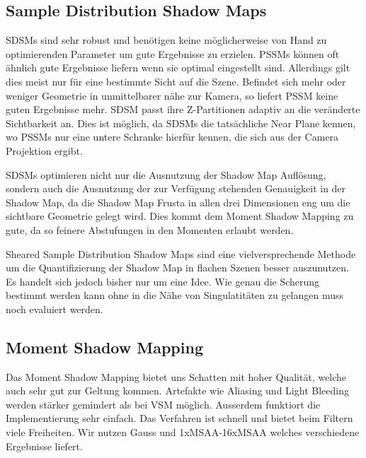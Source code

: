 \documentclass[runningheaders,a4paper]{llncs}
\begin{document}
\subsection{Sample Distribution Shadow Maps}
SDSMs sind sehr robust und benötigen keine möglicherweise von Hand zu optimierenden Parameter um gute Ergebnisse zu erzielen.
PSSMs können oft ähnlich gute Ergebnisse liefern wenn sie optimal eingestellt sind.
Allerdings gilt dies meist nur für eine bestimmte Sicht auf die Szene.
Befindet sich mehr oder weniger Geometrie in unmittelbarer nähe zur Kamera, so liefert PSSM keine guten Ergebnisse mehr.
SDSM passt ihre Z-Partitionen adaptiv an die veränderte Sichtbarkeit an.
Dies ist möglich, da SDSMs die tatsächliche Near Plane kennen, wo PSSMs nur eine untere Schranke hierfür kennen, die sich aus der Camera Projektion ergibt.

SDSMs optimieren nicht nur die Ausnutzung der Shadow Map Auflösung, sondern auch die Ausnutzung der zur Verfügung stehenden Genauigkeit in der Shadow Map, da die Shadow Map Frusta in allen drei Dimensionen eng um die sichtbare Geometrie gelegt wird.
Dies kommt dem Moment Shadow Mapping zu gute, da so feinere Abstufungen in den Momenten erlaubt werden.

Sheared Sample Distribution Shadow Maps sind eine vielversprechende Methode um die Quantifizierung der Shadow Map in flachen Szenen besser auszunutzen.
Es handelt sich jedoch bisher nur um eine Idee.
Wie genau die Scherung bestimmt werden kann ohne in die Nähe von Singulatitäten zu gelangen muss noch evaluiert werden.



\subsection{Moment Shadow Mapping}
Das Moment Shadow Mapping bietet uns Schatten mit hoher Qualität, welche auch sehr gut zur Geltung kommen. Artefakte wie Aliasing und Light Bleeding werden stärker gemindert als bei VSM möglich. Ausserdem funktiort die Implementierung sehr einfach. Das Verfahren ist schnell und bietet beim Filtern viele Freiheiten. Wir nutzen Gauss und 1xMSAA-16xMSAA welches verschiedene Ergebnisse liefert.
\end{document}
